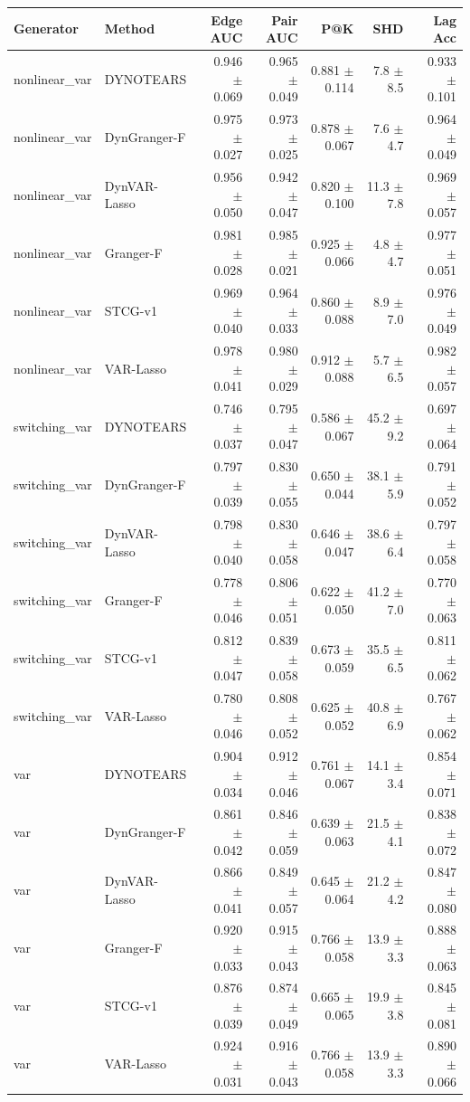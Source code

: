 \begin{tabular}{llrrrrr}
\toprule
Generator & Method & Edge AUC & Pair AUC & P@K & SHD & Lag Acc \\
\midrule
nonlinear_var & DYNOTEARS & 0.946 $\pm$ 0.069 & 0.965 $\pm$ 0.049 & 0.881 $\pm$ 0.114 & 7.8 $\pm$ 8.5 & 0.933 $\pm$ 0.101 \\
nonlinear_var & DynGranger-F & 0.975 $\pm$ 0.027 & 0.973 $\pm$ 0.025 & 0.878 $\pm$ 0.067 & 7.6 $\pm$ 4.7 & 0.964 $\pm$ 0.049 \\
nonlinear_var & DynVAR-Lasso & 0.956 $\pm$ 0.050 & 0.942 $\pm$ 0.047 & 0.820 $\pm$ 0.100 & 11.3 $\pm$ 7.8 & 0.969 $\pm$ 0.057 \\
nonlinear_var & Granger-F & 0.981 $\pm$ 0.028 & 0.985 $\pm$ 0.021 & 0.925 $\pm$ 0.066 & 4.8 $\pm$ 4.7 & 0.977 $\pm$ 0.051 \\
nonlinear_var & STCG-v1 & 0.969 $\pm$ 0.040 & 0.964 $\pm$ 0.033 & 0.860 $\pm$ 0.088 & 8.9 $\pm$ 7.0 & 0.976 $\pm$ 0.049 \\
nonlinear_var & VAR-Lasso & 0.978 $\pm$ 0.041 & 0.980 $\pm$ 0.029 & 0.912 $\pm$ 0.088 & 5.7 $\pm$ 6.5 & 0.982 $\pm$ 0.057 \\
switching_var & DYNOTEARS & 0.746 $\pm$ 0.037 & 0.795 $\pm$ 0.047 & 0.586 $\pm$ 0.067 & 45.2 $\pm$ 9.2 & 0.697 $\pm$ 0.064 \\
switching_var & DynGranger-F & 0.797 $\pm$ 0.039 & 0.830 $\pm$ 0.055 & 0.650 $\pm$ 0.044 & 38.1 $\pm$ 5.9 & 0.791 $\pm$ 0.052 \\
switching_var & DynVAR-Lasso & 0.798 $\pm$ 0.040 & 0.830 $\pm$ 0.058 & 0.646 $\pm$ 0.047 & 38.6 $\pm$ 6.4 & 0.797 $\pm$ 0.058 \\
switching_var & Granger-F & 0.778 $\pm$ 0.046 & 0.806 $\pm$ 0.051 & 0.622 $\pm$ 0.050 & 41.2 $\pm$ 7.0 & 0.770 $\pm$ 0.063 \\
switching_var & STCG-v1 & 0.812 $\pm$ 0.047 & 0.839 $\pm$ 0.058 & 0.673 $\pm$ 0.059 & 35.5 $\pm$ 6.5 & 0.811 $\pm$ 0.062 \\
switching_var & VAR-Lasso & 0.780 $\pm$ 0.046 & 0.808 $\pm$ 0.052 & 0.625 $\pm$ 0.052 & 40.8 $\pm$ 6.9 & 0.767 $\pm$ 0.062 \\
var & DYNOTEARS & 0.904 $\pm$ 0.034 & 0.912 $\pm$ 0.046 & 0.761 $\pm$ 0.067 & 14.1 $\pm$ 3.4 & 0.854 $\pm$ 0.071 \\
var & DynGranger-F & 0.861 $\pm$ 0.042 & 0.846 $\pm$ 0.059 & 0.639 $\pm$ 0.063 & 21.5 $\pm$ 4.1 & 0.838 $\pm$ 0.072 \\
var & DynVAR-Lasso & 0.866 $\pm$ 0.041 & 0.849 $\pm$ 0.057 & 0.645 $\pm$ 0.064 & 21.2 $\pm$ 4.2 & 0.847 $\pm$ 0.080 \\
var & Granger-F & 0.920 $\pm$ 0.033 & 0.915 $\pm$ 0.043 & 0.766 $\pm$ 0.058 & 13.9 $\pm$ 3.3 & 0.888 $\pm$ 0.063 \\
var & STCG-v1 & 0.876 $\pm$ 0.039 & 0.874 $\pm$ 0.049 & 0.665 $\pm$ 0.065 & 19.9 $\pm$ 3.8 & 0.845 $\pm$ 0.081 \\
var & VAR-Lasso & 0.924 $\pm$ 0.031 & 0.916 $\pm$ 0.043 & 0.766 $\pm$ 0.058 & 13.9 $\pm$ 3.3 & 0.890 $\pm$ 0.066 \\
\bottomrule
\end{tabular}
